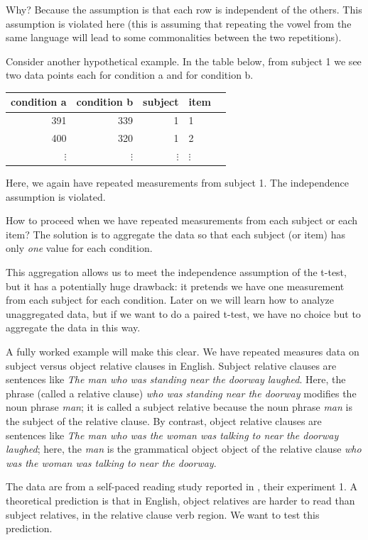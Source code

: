 \documentclass[12pt,]{krantz}
\begin{document}
Why? Because the assumption is that each row is independent of the others. This assumption is violated here (this is assuming that repeating the vowel from the same language will lead to some commonalities between the two repetitions).

Consider another hypothetical example. In the table below, from subject 1 we see two data points each for condition a and for condition b.

\begin{table}[ht]
\centering
\begin{tabular}{rrrll}
\hline
condition a & condition b & subject & item \\ 
\hline
391 & 339 & 1 & 1 \\ 
400 & 320 & 1 & 2 \\ 
$\vdots$ & $\vdots$ & $\vdots$ & $\vdots$\\
\hline
\end{tabular}
\end{table}

Here, we again have repeated measurements from subject 1. The independence assumption is violated.

How to proceed when we have repeated measurements from each subject or each item?
The solution is to aggregate the data so that each subject (or item) has only \emph{one} value for each condition.

This aggregation allows us to meet the independence assumption of the t-test, but it has a potentially huge drawback: it pretends we have one measurement from each subject for each condition.
Later on we will learn how to analyze unaggregated data, but if we want to do a paired t-test, we have no choice but to aggregate the data in this way.

A fully worked example will make this clear. We have repeated measures data on subject versus object relative clauses in English. Subject relative clauses are sentences like \emph{The man who was standing near the doorway laughed}. Here, the phrase (called a relative clause) \emph{who was standing near the doorway} modifies the noun phrase \emph{man}; it is called a subject relative because the noun phrase \emph{man} is the subject of the relative clause. By contrast, object relative clauses are sentences like \emph{The man who was the woman was talking to near the doorway laughed}; here, the \emph{man} is the grammatical object object of the relative clause \emph{who was the woman was talking to near the doorway}.

The data are from a self-paced reading study reported in \citet{grodner}, their experiment 1. A theoretical prediction is that in English, object relatives are harder to read than subject relatives, in the relative clause verb region. We want to test this prediction.
\end{document}
